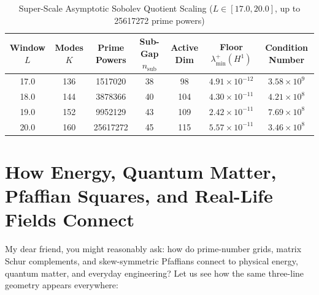 \documentclass[11pt,a4paper]{article}
\begin{document}
\begin{table}[htbp]
\centering
\caption{Super-Scale Asymptotic Sobolev Quotient Scaling ($L \in [17.0, 20.0]$, up to 25617272 prime powers)}
\begin{tabular}{ccccccc}
\toprule
Window $L$ & Modes $K$ & Prime Powers & Sub-Gap $n_{\mathrm{sub}}$ & Active Dim & Floor $\lambda_{\min}^+(H^1)$ & Condition Number \\
\midrule
17.0 & 136 & 1517020 & 38 & 98 & $4.91\times 10^{-12}$ & $3.58\times 10^{9}$ \\
18.0 & 144 & 3878366 & 40 & 104 & $4.30\times 10^{-11}$ & $4.21\times 10^{8}$ \\
19.0 & 152 & 9952129 & 43 & 109 & $2.42\times 10^{-11}$ & $7.69\times 10^{8}$ \\
20.0 & 160 & 25617272 & 45 & 115 & $5.57\times 10^{-11}$ & $3.46\times 10^{8}$ \\
\bottomrule
\end{tabular}
\end{table}


\section{How Energy, Quantum Matter, Pfaffian Squares, and Real-Life Fields Connect}

My dear friend, you might reasonably ask: how do prime-number grids, matrix Schur complements, and skew-symmetric Pfaffians connect to physical energy, quantum matter, and everyday engineering? Let us see how the same three-line geometry appears everywhere:
\end{document}
